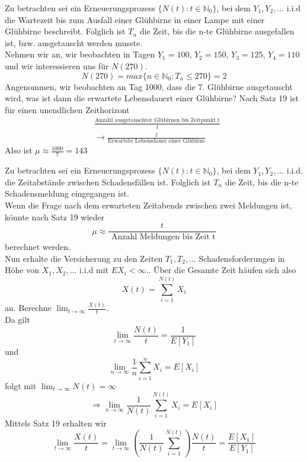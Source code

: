 \documentclass[a4paper,12pt]{article}
\begin{document}
\begin{tcolorbox}[breakable, colframe=blue, colback=white, title=Beispiel 17]
Zu betrachten sei ein Erneuerungsprozess $\{N(t): t \in \mathbb{N}_0\}$, bei dem
$Y_1, Y_2, ...$ i.i.d die Wartezeit bis zum Ausfall einer Glühbirne in einer Lampe
mit einer Glühbirne beschreibt. Folglich ist $T_n$ die Zeit, bis die n-te Glühbirne
ausgefallen ist, bzw. ausgetauscht werden musste.\\
Nehmen wir an, wir beobachten in Tagen $Y_1 = 100$, $Y_2 = 150$, $Y_3 = 125$, $Y_4 = 110$ 
und wir interessieren uns für $N(270)$. 
$$
N(270) = max\{n \in \mathbb{N}_0: T_n \leq 270\} = 2
$$
Angenommen, wir beobachten an Tag 1000, dass die 7. Glühbirne ausgetauscht wird, was 
ist dann die erwartete Lebensdauert einer Glühbirne?
Nach Satz 19 ist für einen unendlichen Zeithorizont
\begin{align*}
&\frac{\text{Anzahl ausgetauschter Glübirnen bis Zeitpunkt t}}{t}\\
 &\to \frac{1}{\text{Erwartete Lebensdauer einer Glübirne}}
\end{align*}
Also ist $\mu \approx \frac{1000}{7} = 143$

\end{tcolorbox}

\begin{tcolorbox}[breakable, colframe=blue, colback=white, title=Beispiel 18]
Zu betrachten sei ein Erneuerungsprozess $\{N(t): t \in \mathbb{N}_0\}$, bei dem
$Y_1, Y_2, ...$ i.i.d. die Zeitabstände zwischen Schadensfällen ist. Folglich ist
$T_n$ die Zeit, bis die n-te Schadensmeldung eingegangen ist.\\
Wenn die Frage nach dem erwarteten Zeitabends zwischen zwei Meldungen ist, könnte nach Satz 19 wieder
$$
\mu \approx \frac{t}{\text{ Anzahl Meldungen bis Zeit t}}
$$
berechnet werden.\\
Nun erhalte die Versicherung zu den Zeiten $T_1, T_2, ...$ Schadensforderungen in Höhe von
$X_1, X_2, ...$ i.i.d mit $E{X_i}< \infty.$. Über die Gesamte Zeit häufen sich also
$$
X(t) = \sum_{i=1}^{N(t)}X_i
$$
an. Berechne $\lim_{t \to \infty}\frac{X(t)}{t}$.\\
Da gilt 
$$
\lim_{t \to \infty}\frac{N(t)}{t} = \frac{1}{E[Y_1]}
$$
und
$$
\lim_{n \to \infty}\frac{1}{n}\sum_{i=1}^{n}X_i = E[X_i]
$$
folgt mit $\lim_{t \to \infty}N(t)= \infty$
$$
\Rightarrow \lim_{n \to \infty} \frac{1}{N(t)}\sum_{i=1}^{N(t)}X_i = E[X_i]
$$
Mittels Satz 19 erhalten wir
$$
\lim_{t \to \infty} \frac{X(t)}{t} =\lim_{t \to \infty} \left(\frac{1}{N(t)}\sum_{i=1}^{N(t)}\right)\frac{N(t)}{t} =
\frac{E[X_1]}{E[Y_1]}
$$
\end{tcolorbox}
\end{document}

